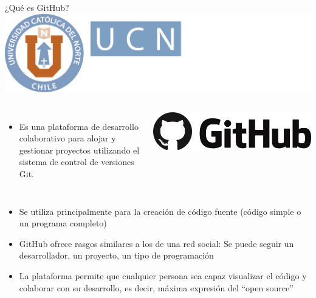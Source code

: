 \documentclass[12pt,a4paper,usenames,x11names,compress]{beamer}
\begin{document}
\begin{frame}{¿Qué es GitHub?\hfill \includegraphics[scale=.1]{eciem.png}}
\begin{columns}
 \begin{itemize}
 \justifying
\item Es una plataforma de desarrollo colaborativo para alojar y gestionar proyectos utilizando el sistema de control de versiones Git.
 \end{itemize}

\includegraphics[scale=.027]{github.png}  
\end{columns}
\begin{itemize}
\justifying
\item Se utiliza principalmente para la creación de código fuente (código simple o un programa completo)
\item GitHub ofrece rasgos similares a los de una red social: Se puede seguir un desarrollador, un proyecto, un tipo de programación 
\item La plataforma permite que  cualquier persona  sea capaz visualizar el código y colaborar con su desarrollo, es decir, máxima expresión del ``open source''
\end{itemize}
\end{frame}
\end{document}
